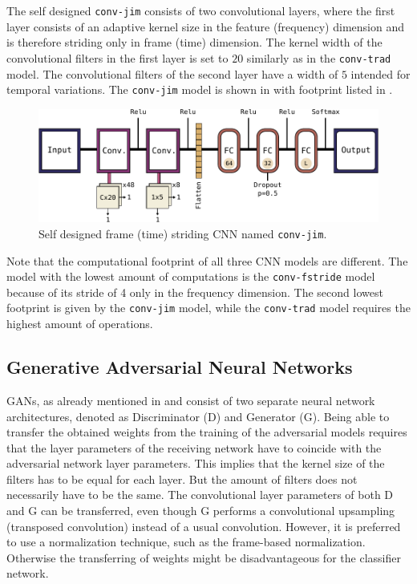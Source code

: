 The self designed \texttt{conv-jim} consists of two convolutional layers, where the first layer consists of an adaptive kernel size in the feature (frequency) dimension and is therefore striding only in frame (time) dimension.
The kernel width of the convolutional filters in the first layer is set to $20$ similarly as in the \texttt{conv-trad} model.
The convolutional filters of the second layer have a width of $5$ intended for temporal variations.
The \texttt{conv-jim} model is shown in  with footprint listed in .
\begin{figure}[!ht]
  \centering
    \includegraphics[height=0.2\textwidth]{./4_nn/figs/nn_arch_cnn_jim.pdf}
  \caption{Self designed frame (time) striding CNN named \texttt{conv-jim}.}
  \label{fig:nn_arch_cnn_jim}
\end{figure}
\FloatBarrier
\noindent


Note that the computational footprint of all three CNN models are different.
The model with the lowest amount of computations is the \texttt{conv-fstride} model because of its stride of 4 only in the frequency dimension.
The second lowest footprint is given by the \texttt{conv-jim} model, while the \texttt{conv-trad} model requires the highest amount of operations.



\subsection{Generative Adversarial Neural Networks}\label{sec:nn_arch_adv}
GANs, as already mentioned in  and  consist of two separate neural network architectures, denoted as Discriminator (D) and Generator (G).
Being able to transfer the obtained weights from the training of the adversarial models requires that the layer parameters of the receiving network have to coincide with the adversarial network layer parameters.
This implies that the kernel size of the filters has to be equal for each layer.
But the amount of filters does not necessarily have to be the same.
The convolutional layer parameters of both D and G can be transferred, even though G performs a convolutional upsampling (transposed convolution) instead of a usual convolution.
However, it is preferred to use a normalization technique, such as the frame-based normalization. 
Otherwise the transferring of weights might be disadvantageous for the classifier network.


